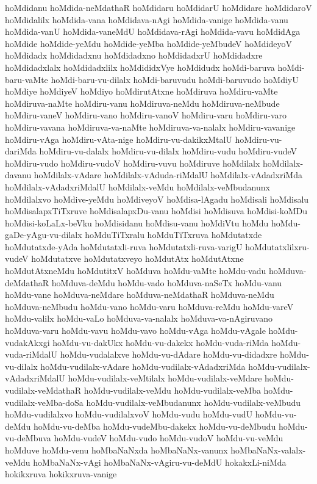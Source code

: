 {hoMdidanu
hoMdida-neMdathaR
hoMdidaru
hoMdidarU
hoMdidare
hoMdidaroV
hoMdidalilx
hoMdida-vana
hoMdidava-nAgi
hoMdida-vanige
hoMdida-vanu
hoMdida-vanU
hoMdida-vaneMdU
hoMdidava-rAgi
hoMdida-vavu
hoMdidAga
hoMdide
hoMdide-yeMdu
hoMdide-yeMba
hoMdide-yeMbudeV
hoMdideyoV
hoMdidadx
hoMdidadxnu
hoMdidadxno
hoMdidadxrU
hoMdidadxre
hoMdidadxlalx
hoMdidadxlilx
hoMdididxVye
hoMdidudx
hoMdi-baruva
hoMdi-baru-vaMte
hoMdi-baru-vu-dilalx
hoMdi-baruvudu
hoMdi-baruvudo
hoMdiyU
hoMdiye
hoMdiyeV
hoMdiyo
hoMdirutAtxne
hoMdiruva
hoMdiru-vaMte
hoMdiruva-naMte
hoMdiru-vanu
hoMdiruva-neMdu
hoMdiruva-neMbude
hoMdiru-vaneV
hoMdiru-vano
hoMdiru-vanoV
hoMdiru-varu
hoMdiru-varo
hoMdiru-vavana
hoMdiruva-va-naMte
hoMdiruva-va-nalalx
hoMdiru-vavanige
hoMdiru-vAga
hoMdiru-vAta-nige
hoMdiru-vu-dakikxMtalU
hoMdiru-vu-dariMda
hoMdiru-vu-dalalx
hoMdiru-vu-dilalx
hoMdiru-vudu
hoMdiru-vudeV
hoMdiru-vudo
hoMdiru-vudoV
hoMdiru-vuvu
hoMdiruve
hoMdilalx
hoMdilalx-davanu
hoMdilalx-vAdare
hoMdilalx-vAduda-riMdalU
hoMdilalx-vAdadxriMda
hoMdilalx-vAdadxriMdalU
hoMdilalx-veMdu
hoMdilalx-veMbudanunx
hoMdilalxvo
hoMdive-yeMdu
hoMdiveyoV
hoMdisa-lAgadu
hoMdisali
hoMdisalu
hoMdisalapxTiTxruve
hoMdisalapxDu-vanu
hoMdisi
hoMdisuva
hoMdisi-koMDu
hoMdisi-koLaLx-beVku
hoMdisidanu
hoMdisu-vanu
hoMdiVtu
hoMdu
hoMdu-gaDe-yAgu-vu-dilalx
hoMduTiTxralu
hoMduTiTxruva
hoMdutatxde
hoMdutatxde-yAda
hoMdutatxli-ruva
hoMdutatxli-ruva-varigU
hoMdutatxlilxru-vudeV
hoMdutatxve
hoMdutatxveyo
hoMdutAtx
hoMdutAtxne
hoMdutAtxneMdu
hoMdutitxV
hoMduva
hoMdu-vaMte
hoMdu-vadu
hoMduva-deMdathaR
hoMduva-deMdu
hoMdu-vado
hoMduva-naSeTx
hoMdu-vanu
hoMdu-vane
hoMduva-neMdare
hoMduva-neMdathaR
hoMduva-neMdu
hoMduva-neMbudu
hoMdu-vano
hoMdu-varu
hoMduva-reMdu
hoMdu-vareV
hoMdu-valilx
hoMdu-vaLo
hoMduva-va-nalalx
hoMduva-va-nAgiruvano
hoMduva-varu
hoMdu-vavu
hoMdu-vavo
hoMdu-vAga
hoMdu-vAgale
hoMdu-vudakAkxgi
hoMdu-vu-dakUkx
hoMdu-vu-dakekx
hoMdu-vuda-riMda
hoMdu-vuda-riMdalU
hoMdu-vudalalxve
hoMdu-vu-dAdare
hoMdu-vu-didadxre
hoMdu-vu-dilalx
hoMdu-vudilalx-vAdare
hoMdu-vudilalx-vAdadxriMda
hoMdu-vudilalx-vAdadxriMdalU
hoMdu-vudilalx-veMtilalx
hoMdu-vudilalx-veMdare
hoMdu-vudilalx-veMdathaR
hoMdu-vudilalx-veMdu
hoMdu-vudilalx-veMba
hoMdu-vudilalx-veMba-doSa
hoMdu-vudilalx-veMbudanunx
hoMdu-vudilalx-veMbudu
hoMdu-vudilalxvo
hoMdu-vudilalxvoV
hoMdu-vudu
hoMdu-vudU
hoMdu-vu-deMdu
hoMdu-vu-deMba
hoMdu-vudeMbu-dakekx
hoMdu-vu-deMbudu
hoMdu-vu-deMbuva
hoMdu-vudeV
hoMdu-vudo
hoMdu-vudoV
hoMdu-vu-veMdu
hoMduve
hoMdu-venu
hoMbaNaNxda
hoMbaNaNx-vanunx
hoMbaNaNx-valalx-veMdu
hoMbaNaNx-vAgi
hoMbaNaNx-vAgiru-vu-deMdU
hokakxLi-niMda
hokikxruva
hokikxruva-vanige
}
